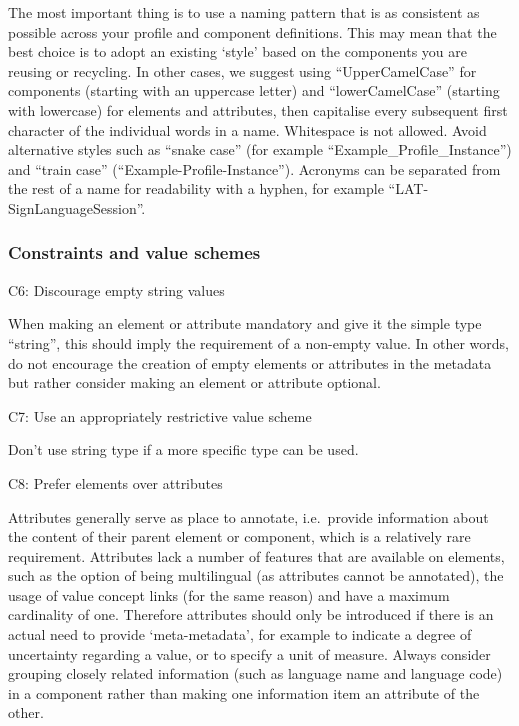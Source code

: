 The most important thing is to use a naming pattern that is as
consistent as possible across your profile and component definitions. This may mean that the best choice is to adopt an existing `style' based on the components you are reusing or recycling. In other cases, we suggest using ``UpperCamelCase'' for components (starting with an uppercase letter) and ``lowerCamelCase'' (starting with lowercase) for elements and attributes, then capitalise every subsequent first character of the individual words in a name. Whitespace is not allowed.
Avoid alternative styles such as ``snake case'' (for example
``Example\_Profile\_Instance'') and ``train case'' (``Example-Profile-Instance''). Acronyms can be separated from the rest of a name for readability with a hyphen, for example
``LAT-SignLanguageSession''.

\subsubsection{Constraints and value schemes} \label{constraints-and-value-schemes}

\label{c6}
C6: Discourage empty string values


When making an element or attribute mandatory and give it the simple type ``string'', this should imply the requirement of a non-empty value. In other words, do not encourage the creation of empty elements or attributes in the metadata but rather consider making an element or attribute optional.

C7: Use an appropriately restrictive value scheme


Don't use string type if a more specific type can be used.

\label{c8}
C8: Prefer elements over attributes


Attributes generally serve as place to annotate, i.e.~provide
information about the content of their parent element or component, which is a relatively rare requirement. Attributes lack a number of features that are available on elements, such as the option of being multilingual (as attributes cannot be annotated), the usage of value concept links (for the same reason) and have a maximum cardinality of one. Therefore attributes should only be introduced if there is an actual need to provide `meta-metadata', for example to indicate a degree of uncertainty regarding a value, or to specify a unit of measure. Always consider grouping closely related information (such as language name and language code) in a component rather than making one information item an attribute of the other.

